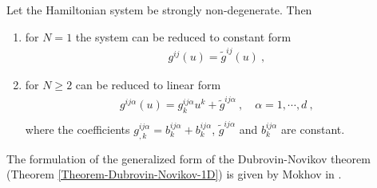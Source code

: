 \begin{theorem}
    Let the Hamiltonian system be strongly non-degenerate. Then
    \begin{enumerate}
        \item for $N=1$ the system can be reduced to constant form
        \begin{align}
            g^{ij}(u) = \tilde g^{ij}(u) \:,
        \end{align}

        \item for $N \geq 2$ can be reduced to linear form
        \begin{align}
            g^{ij \alpha}(u) = g^{ij \alpha}_k u^k + \tilde g^{ij \alpha} \:, \quad \alpha = 1, \cdots , d \:, \\
        \end{align}
        where the coefficients $g^{ij \alpha}_{,k} = b^{ij \alpha}_k + b^{ij \alpha}_k$, $\tilde g^{ij \alpha}$ and $b^{ij \alpha}_k$ are constant.
    \end{enumerate}
\end{theorem}

The formulation of the generalized form of the Dubrovin-Novikov theorem (Theorem \vref{Theorem-Dubrovin-Novikov-1D}) is given by Mokhov in \cite{Mochov}.

